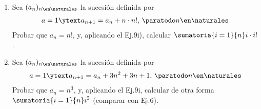 \begin{enunciado}{\ejercicio}
    \begin{enumerate}[label=\roman*)]
        \item Sea $(a_n)_{n \en \naturales }$ la sucesión definida por
        \begin{align*}
            a = 1  \ytext  a_{n+1} = a_n + n \cdot n!,\, \paratodo n \en \naturales 
        \end{align*}
        Probar que $a_n = n!$, y, aplicando el Ej.9i), calcular $\displaystyle \sumatoria{i=1}{n} i \cdot i!$.
        
        \item Sea $(a_n)_{n \en \naturales }$ la sucesión definida por
        \begin{align*}
            a = 1  \ytext  a_{n+1} = a_n + 3n^2 + 3n + 1,\, \paratodo n \en \naturales 
        \end{align*}
        Probar que $a_n = n^3$, y, aplicando el Ej.9i, calcular de otra forma $\displaystyle \sumatoria{i=1}{n} i^2$ 
        (comparar con Ej.6).
    \end{enumerate}
\end{enunciado}

